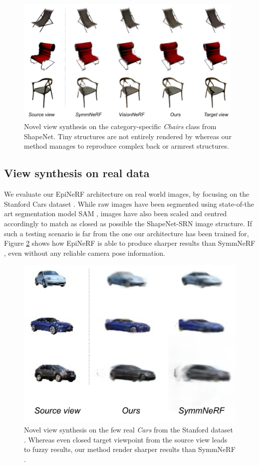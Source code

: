 \begin{figure}[htb!]
    \center
  \includegraphics[height=6.1cm]{images/epinerf/exp-srn-chairs.png}
  \caption{Novel view synthesis on the category-specific \textit{Chairs} class from ShapeNet. Tiny structures are not entirely rendered by \citep{li2022symmnerf,lin2023vision} whereas our method manages to reproduce complex back or armrest structures.}
  \label{fig:exp-srn-chair}
\end{figure}

\subsection{View synthesis on real data}
We evaluate our EpiNeRF architecture on real world images, by focusing on the Stanford Cars dataset \citep{krause20133d}. While raw images have been segmented using state-of-the art segmentation model SAM \citep{kirillov2023segment}, images have also been scaled and centred accordingly to match as closed as possible the ShapeNet-SRN image structure. If such a testing scenario is far from the one our architecture has been trained for, Figure \ref{fig:res_Stanfordcar} shows how EpiNeRF is able to produce sharper results than SymmNeRF \citep{li2022symmnerf}, even without any reliable camera pose information.

\begin{figure}[htb!]
    \center
  \includegraphics[height=6.cm]{images/epinerf/res_standford_cars.png}
  \caption{Novel view synthesis on the few real \textit{Cars} from the Stanford dataset \citep{krause20133d}. Whereas even closed target viewpoint from the source view leads to fuzzy results, our method render sharper results than SymmNeRF \citep{li2022symmnerf}. }
  \label{fig:res_Stanfordcar}
\end{figure}



